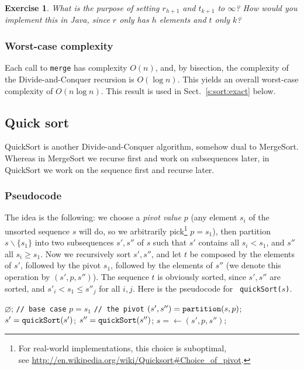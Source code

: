 \documentclass[a4paper]{book}
\theoremstyle{changebreak}                %
\newtheorem{ex}[result]{Exercise}
\begin{document}
\begin{ex}
What is the purpose of setting $r_{h+1}$ and $t_{k+1}$ to $\infty$?
How would you implement this in Java, since $r$ only has $h$ elements
and $t$ only $k$?
\end{ex}


\subsubsection{Worst-case complexity}
\label{s:sorting:merge:complexity}
Each call to {\tt merge} has complexity $O(n)$, and, by
bisection, the complexity of the {\sc
  Divide-and-Conquer}
recursion is $O(\log n)$. This yields an overall
worst-case complexity of $O(n\log n)$. This result is used in
Sect.~\ref{s:sort:exact} below.

\subsection{Quick sort}
{\sc QuickSort} is another {\sc
  Divide-and-Conquer} algorithm, somehow dual to {\sc
  MergeSort}. Whereas in {\sc
  MergeSort} we recurse first and work on
subsequences later, in {\sc QuickSort} we work on
the sequence first and recurse later.

\subsubsection{Pseudocode}
The idea is the following: we choose a {\it pivot value}
$p$ (any element $s_i$ of the unsorted
sequence $s$ will do, so we arbitrarily
pick\footnote{For real-world implementations, this choice is
  suboptimal, \\ see
  \url{http://en.wikipedia.org/wiki/Quicksort\#Choice_of_pivot}.}
$p=s_1$), then partition $s\smallsetminus \{s_1\}$
into two subsequences $s',s''$ of $s$ such that
$s'$ contains all $s_i<s_1$, and $s''$ all $s_i\ge s_1$. Now we
recursively sort $s',s''$, and let $t$ be
composed by the elements of $s'$, followed by the pivot
$s_1$, followed by the elements of $s''$ (we denote this operation by
$(s',p,s'')$). The sequence $t$ is obviously
sorted, since $s',s''$ are sorted, and
$s'_i<s_1\le s''_j$ for all $i,j$. Here is the pseudocode for {\tt
  quickSort($s$)}.
\begin{algorithmic}[1]
  \RETURN $\varnothing$; {\tt // base case}
\ELSE
  \STATE $p=s_1$ {\tt // the pivot}
  \STATE $(s',s'')=\mbox{\tt partition}(s,p)$;
  \STATE $s'=\mbox{\tt quickSort}(s')$;
  \STATE $s''=\mbox{\tt quickSort}(s'')$;
  \STATE $s=\leftarrow (s',p,s'')$;
\ENDIF
\end{algorithmic}
\end{document}
